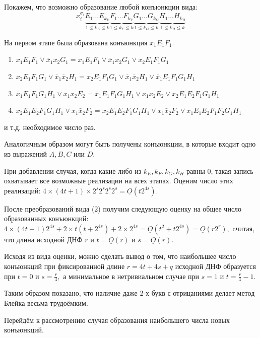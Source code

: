 \documentclass[12pt,a4paper,oneside,fleqn,leqno]{article}
\theoremstyle{definition}
\begin{document}
			Покажем, что возможно образование любой конъюнкции вида:
			$$
			x_i^{\sigma_i} \underbrace{E_1\ldots E_{k_E}}_{1\leqslant k_E \leqslant k}\underbrace{F_1\ldots F_{k_F}}_{1\leqslant k_F \leqslant k}\underbrace{G_1\ldots G_{k_G}}_{1\leqslant k_G \leqslant k}\underbrace{H_1\ldots H_{k_H}}_{1\leqslant k_H \leqslant k}$$\par
			На первом этапе была образована конъюнкция $x_1E_1F_1.$
			\begin{enumerate}\itemsep=0pt
				\item
				$x_1E_1F_1 \vee \bar{x}_1x_2G_1 = x_1E_1F_1 \vee \bar{x}_1x_2G_1 \vee x_2E_1F_1G_1$
				\item
				$x_2E_1F_1G_1 \vee \bar{x}_1\bar{x}_2H_1 = x_2E_1F_1G_1 \vee \bar{x}_1\bar{x}_2H_1 \vee \bar{x}_1E_1F_1G_1H_1$
				\item
				$\bar{x}_1E_1F_1G_1H_1 \vee x_1x_2E_2 = \bar{x}_1E_1F_1G_1H_1 \vee x_1x_2E_2 \vee x_2E_1E_2F_1G_1H_1$
				\item
				$x_2E_1E_2F_1G_1H_1 \vee x_1\bar{x}_2F_2 = x_2E_1E_2F_1G_1H_1 \vee x_1\bar{x}_2F_2 \vee x_1E_1E_2F_1F_2G_1H_1$
			\end{enumerate}
			и т.д. необходимое число раз.\par
			Аналогичным образом могут быть получены конъюнкции, в которые входит одно из выражений $A, B, C$ или $D.$\par
			При добавлении случая, когда какие-либо из $k_E, k_F, k_G, k_H$ равны 0, такая запись охватывает все возможные реализации на всех этапах. Оценим число этих реализаций: $4 \times (4t + 1) \times 2^s2^s2^s2^s = \underline{O}(t2^{4s}).$\par
			После преобразований вида (2) получим следующую оценку на общее число образованных конъюнкций: $4\times (4t + 1)2^{4s} + 2\times t(t + 2^{4s}) + 2\times 2^{4s} = \underline{O}(t^2 + t2^{4s}) = \underline{O}(r2^r),$ cчитая, что длина исходной ДНФ $r$ и $t = \underline{O}(r)$ и $s = \underline{O}(r).$ \par
			Исходя из вида оценки, можно сделать вывод о том, что наибольшее число конъюнкций при фиксированной длине $r = 4t + 4s + q$ исходной ДНФ образуется при $t = 0$ и $s = \frac{r}{4},$ а минимальное в нетривиальном случае при $s = 1$ и $t = \frac{r}{4} - 1.$\par
			Таким образом показано, что наличие даже 2-х букв с отрицаниями делает метод Блейка весьма трудоёмким.\par
			Перейдём к рассмотрению случая образования наибольшего числа новых конъюнкций.\par
\end{document}
